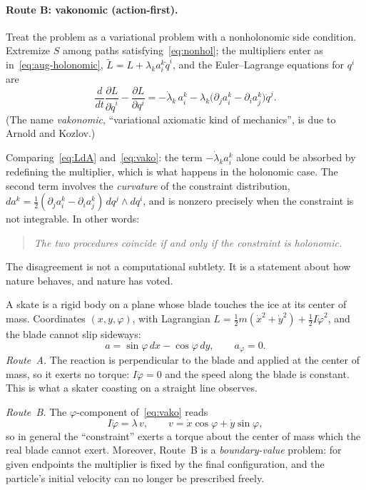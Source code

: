 \paragraph{Route B: vakonomic (action-first).}
Treat the problem as a variational problem with a nonholonomic side
condition. Extremize $S$ among paths satisfying~\eqref{eq:nonhol}; the
multipliers enter as in~\eqref{eq:aug-holonomic},
$\tilde L=L+\lambda_k a^k_i\dot q^i$, and the Euler--Lagrange equations
for $q^i$ are
\begin{equation}
  \frac{d}{dt}\frac{\partial L}{\partial\dot q^i}-\frac{\partial L}{\partial q^i}
  =-\dot\lambda_k\,a^k_i-\lambda_k\bigl(\partial_ja^k_i-\partial_ia^k_j\bigr)\dot q^j .
  \label{eq:vako}
\end{equation}
(The name \emph{vakonomic}, ``variational axiomatic kind of mechanics'', is due
to Arnold and Kozlov.)

Comparing~\eqref{eq:LdA} and~\eqref{eq:vako}: the term $-\dot\lambda_ka^k_i$
alone could be absorbed by redefining the multiplier, which is what happens
in the holonomic case. The second term involves the \emph{curvature} of the
constraint distribution, $d a^k=\tfrac12(\partial_ja^k_i-\partial_ia^k_j)\,dq^j\wedge dq^i$,
and is nonzero precisely when the constraint is not integrable. In other
words:
\begin{quote}
\emph{The two procedures coincide if and only if the constraint is
holonomic.}
\end{quote}
The disagreement is not a computational subtlety. It is a statement about
how nature behaves, and nature has voted.

\begin{example}[A skate]\label{ex:skate}
A skate is a rigid body on a plane whose blade touches the ice at its center
of mass. Coordinates $(x,y,\varphi)$, with Lagrangian
$L=\tfrac12m(\dot x^2+\dot y^2)+\tfrac12I\dot\varphi^2$, and the blade cannot
slip sideways:
\[
  a=\sin\varphi\,dx-\cos\varphi\,dy,\qquad a_\varphi=0 .
\]
\emph{Route~A.} The reaction is perpendicular to the blade and applied at the
center of mass, so it exerts no torque: $I\ddot\varphi=0$ and the speed along
the blade is constant. This is what a skater coasting on a straight line
observes.

\emph{Route~B.} The $\varphi$-component of~\eqref{eq:vako} reads
\[
  I\ddot\varphi=\lambda\,v,\qquad v=\dot x\cos\varphi+\dot y\sin\varphi,
\]
so in general the ``constraint'' exerts a torque about the center of mass
which the real blade cannot exert. Moreover, Route~B is a
\emph{boundary-value} problem: for given endpoints the multiplier is fixed
by the final configuration, and the particle's initial velocity can no longer be
prescribed freely.
\end{example}

